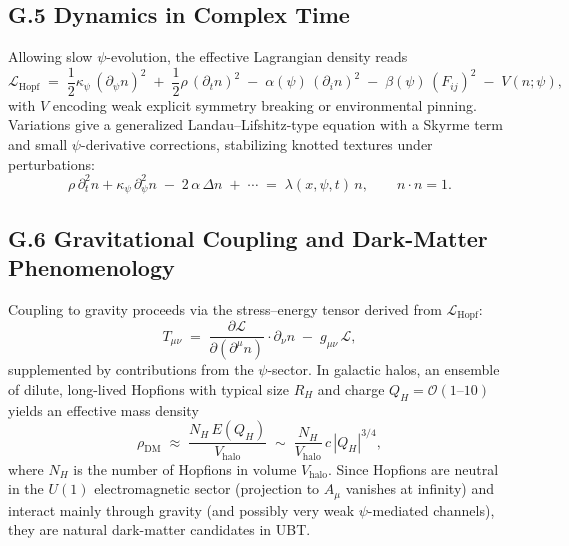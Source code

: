 \documentclass[12pt,a4paper]{article}
\begin{document}
\subsection*{G.5 Dynamics in Complex Time}
Allowing slow $\psi$-evolution, the effective Lagrangian density reads
\begin{equation}
\mathcal{L}_{\mathrm{Hopf}} \;=\; \frac{1}{2} \kappa_\psi \, (\partial_\psi n)^2 \;+\; \frac{1}{2}\rho \, (\partial_t n)^2 \;-\; \alpha(\psi)\, (\partial_i n)^2 \;-\; \beta(\psi)\, (F_{ij})^2 \;-\; V(n;\psi),
\end{equation}
with $V$ encoding weak explicit symmetry breaking or environmental pinning. 
Variations give a generalized Landau--Lifshitz-type equation with a Skyrme term and small $\psi$-derivative corrections, stabilizing knotted textures under perturbations:
\begin{equation}
\rho\, \partial_t^2 n + \kappa_\psi\, \partial_\psi^2 n \;-\; 2\,\alpha \,\Delta n \;+\; \cdots \;=\; \lambda(x,\psi,t)\, n,\qquad n\cdot n=1.
\end{equation}

\subsection*{G.6 Gravitational Coupling and Dark-Matter Phenomenology}
Coupling to gravity proceeds via the stress--energy tensor derived from $\mathcal{L}_{\mathrm{Hopf}}$:
\begin{equation}
T_{\mu\nu} \;=\; \frac{\partial \mathcal{L}}{\partial(\partial^\mu n)}\cdot \partial_\nu n \;-\; g_{\mu\nu}\,\mathcal{L},
\end{equation}
supplemented by contributions from the $\psi$-sector. 
In galactic halos, an ensemble of dilute, long-lived Hopfions with typical size $R_H$ and charge $Q_H=\mathcal{O}(1\text{--}10)$ yields an effective mass density
\begin{equation}
\rho_{\mathrm{DM}} \;\approx\; \frac{N_H\, E(Q_H)}{V_{\mathrm{halo}}} \;\sim\; \frac{N_H}{V_{\mathrm{halo}}}\, c\, |Q_H|^{3/4},
\end{equation}
where $N_H$ is the number of Hopfions in volume $V_{\mathrm{halo}}$. 
Since Hopfions are neutral in the $U(1)$ electromagnetic sector (projection to $A_\mu$ vanishes at infinity) and interact mainly through gravity (and possibly very weak $\psi$-mediated channels), they are natural dark-matter candidates in UBT.
\end{document}
